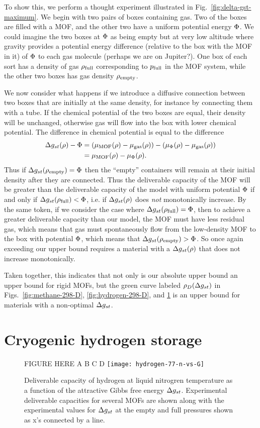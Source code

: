 To show this, we perform a thought experiment illustrated in Fig.~\ref{fig:delta-gst-maximum}.  We begin with two pairs of boxes containing gas.  Two of the boxes are filled with a MOF, and the other two have a uniform potential energy $\Phi$.  We could imagine the two boxes at $\Phi$ as being empty but at very low altitude where gravity provides a potential energy difference (relative to the box with the MOF in it) of $\Phi$ to each gas molecule (perhaps we are on Jupiter?).  One box of each sort has a density of gas $\rho_{\text{full}}$ corresponding to $p_{\text{full}}$ in the MOF system, while the other two boxes has gas density $\rho_{\text{empty}}$.

We now consider what happens if we introduce a diffusive connection between two boxes that are initially at the same density, for instance by connecting them with a tube.  If the chemical potential of the two boxes are equal, their density will be unchanged, otherwise gas will flow into the box with lower chemical potential.  The difference in chemical potential is equal to the difference
\begin{align}
   \Delta g_{st}(\rho) - \Phi &= \left(\mu_{\text{MOF}}(\rho) - \mu_{\text{gas}}(\rho)\right)
   - \left(\mu_{\Phi}(\rho) - \mu_{\text{gas}}(\rho)\right)
   \\
   &= \mu_{\text{MOF}}(\rho) - \mu_{\Phi}(\rho).
\end{align}
Thus if $\Delta g_{st}(\rho_{\text{empty}}) = \Phi$ then the ``empty'' containers will remain at their initial density after they are connected.  Thus the deliverable capacity of the MOF will be greater than the deliverable capacity of the model with uniform potential $\Phi$ if and only if $\Delta g_{st}(\rho_{\text{full}})<\Phi$, i.e. if $\Delta g_{st}(\rho)$ does \emph{not} monotonically increase.  By the same token, if we consider the case where $\Delta g_{st}(\rho_{\text{full}}) = \Phi$, then to achieve a greater deliverable capacity than our model, the MOF must have less residual gas, which means that gas must spontaneously flow from the low-density MOF to the box with potential $\Phi$, which means that $\Delta g_{st}(\rho_{\text{empty}})>\Phi$.  So once again exceeding our upper bound requires a material with a $\Delta g_{st}(\rho)$ that does not increase monotonically.

Taken together, this indicates that not only is our absolute upper bound an upper bound for rigid MOFs, but the green curve labeled $\rho_D(\Delta g_{st})$ in Figs.~\ref{fig:methane-298-D}, \ref{fig:hydrogen-298-D}, and \ref{fig:hydrogen-77-D} is an upper bound for materials with a non-optimal $\Delta g_{st}$.

\section{Cryogenic hydrogen storage}\label{sec:cryo-hydrogen}
\begin{figure}
    \centering
    FIGURE HERE A B C D
    \texttt{[image: hydrogen-77-n-vs-G]}
    \caption{Deliverable capacity of hydrogen at liquid nitrogren temperature as a function of the attractive Gibbs free energy $\Delta g_{st}$. Experimental deliverable capacities for several MOFs are shown along with the experimental values for $\Delta g_{st}$ at the empty and full pressures shown as x's connected by a line.}
    \label{fig:hydrogen-77-D}
\end{figure}

